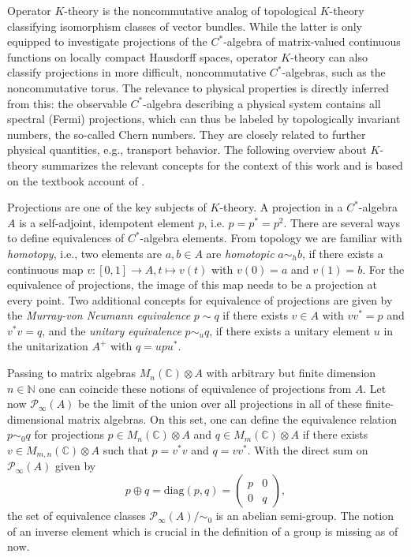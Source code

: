 \documentclass[submission, Phys]{SciPost}
\begin{document}
Operator $K$-theory is the noncommutative analog of topological $K$-theory classifying isomorphism classes of vector bundles. While the latter is only equipped to investigate projections of the $C^\ast$-algebra of matrix-valued continuous functions on locally compact Hausdorff spaces, operator $K$-theory can also classify projections in more difficult, noncommutative $C^\ast$-algebras, such as the noncommutative torus.
The relevance to physical properties is directly inferred from this: the observable $C^*$-algebra describing a physical system contains all spectral (Fermi) projections, which can thus be labeled by topologically invariant numbers, the so-called Chern numbers. They are closely related to further physical quantities, e.g., transport behavior.
The following overview about $K$-theory summarizes the relevant concepts for the context of this work and is based on the textbook account of \cite{Rordam2000}.

Projections are one of the key subjects of $K$-theory.
A projection in a $C^\ast$-algebra $A$ is a self-adjoint, idempotent element $p$, i.e. $p=p^\ast=p^2$. 
There are several ways to define equivalences of $C^\ast$-algebra elements. 
From topology we are familiar with \emph{homotopy}, i.e., two elements are $a,b\in A$ are \emph{homotopic} $a\sim_h b$, if there exists a continuous map $v:[0,1]\to A, t\mapsto v(t)$ with $v(0)=a$ and $v(1)=b$.
For the equivalence of projections, the image of this map needs to be a projection at every point.
Two additional concepts for equivalence of projections are given by the \emph{Murray-von Neumann equivalence} $p\sim q$ if there exists $v\in A$ with $vv^\ast=p$ and $v^\ast v=q$, and the \emph{unitary equivalence} $p\sim_u q$, if there exists a unitary element $u$ in the unitarization $A^+$ with $q=upu^\ast$.

Passing to matrix algebras $M_n(\mathbb{C})\otimes A$ with arbitrary but finite dimension $n\in\mathbb{N}$ one can coincide these notions of equivalence of projections from $A$. 
Let now $\mathcal{P}_\infty(A)$ be the limit of the union over all projections in all of these finite-dimensional matrix algebras. 
On this set, one can define the equivalence relation $p \sim_0 q$ for projections $p \in M_n(\mathbb{C})\otimes A$ and $q \in M_m(\mathbb{C})\otimes A$ if there exists $v \in  M_{m,n}(\mathbb{C})\otimes A$ such that $p=v^\ast v$ and $q=vv^\ast$.
With the direct sum on $\mathcal{P}_\infty(A)$ given by
\begin{equation}
    p\oplus q = \text{diag}(p,q)=\begin{pmatrix}
        p & 0 \\ 0 & q
    \end{pmatrix},
\end{equation}
the set of equivalence classes $\mathcal{P}_\infty(A)/\sim_0$ is an abelian semi-group.
The notion of an inverse element which is crucial in the definition of a group is missing as of now.
\end{document}
